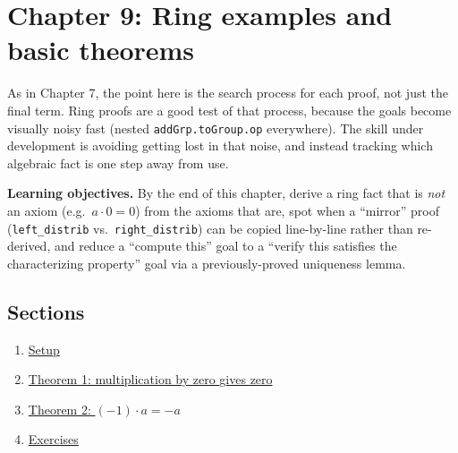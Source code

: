 \chapter{Chapter 9: Ring examples and basic theorems}\label{sec:09-ring-theorems:00-index:1}

As in Chapter 7, the point here is the search process for each proof, not just the final term. Ring proofs are a good test of that process, because the goals become visually noisy fast (nested \texttt{addGrp.toGroup.op} everywhere). The skill under development is avoiding getting lost in that noise, and instead tracking which algebraic fact is one step away from use.

\textbf{Learning objectives.} By the end of this chapter, derive a ring fact that is \emph{not} an axiom (e.g.~\(a\cdot 0=0\)) from the axioms that are, spot when a ``mirror'' proof (\texttt{left\_distrib} vs.~\texttt{right\_distrib}) can be copied line-by-line rather than re-derived, and reduce a ``compute this'' goal to a ``verify this satisfies the characterizing property'' goal via a previously-proved uniqueness lemma.

\section{Sections}\label{sec:09-ring-theorems:00-index:2}

\begin{enumerate}
\def\labelenumi{\arabic{enumi}.}
\tightlist
\item
  \hyperref[sec:09-ring-theorems:01-setup:1]{Setup}
\item
  \hyperref[sec:09-ring-theorems:02-theorem-1:1]{Theorem 1: multiplication by zero gives zero}
\item
  \hyperref[sec:09-ring-theorems:03-theorem-2:1]{Theorem 2: \((-1) \cdot a = -a\)}
\item
  \hyperref[sec:09-ring-theorems:04-exercises:1]{Exercises}
\end{enumerate}





